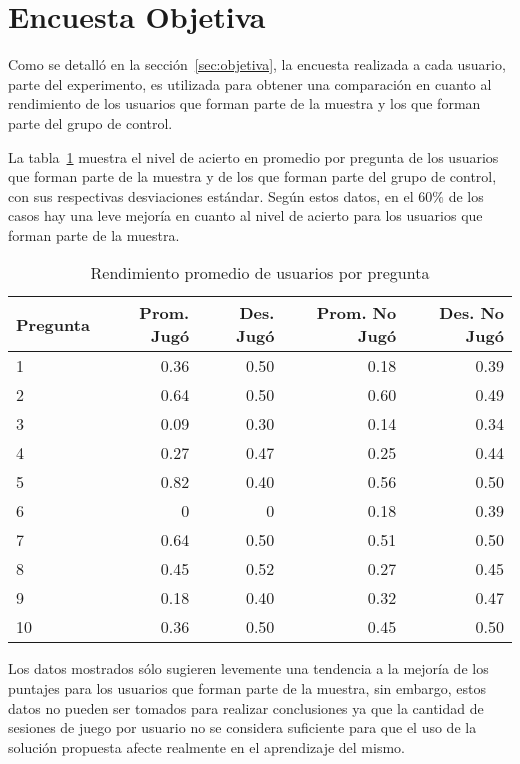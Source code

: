 \section{Encuesta Objetiva}
\label{sec:res_OBJETIVA}

Como se detalló en la sección~\ref{sec:objetiva}, la encuesta realizada a cada
usuario, parte del experimento, es utilizada para obtener una comparación en
cuanto al rendimiento de los usuarios que forman parte de la muestra y los que
forman parte del grupo de control.

La tabla~\ref{tab:objetiva_rendimiento_por_pregunta} muestra el nivel de acierto
en promedio por pregunta de los usuarios que forman parte de la muestra y de los que
forman parte del grupo de control, con sus respectivas desviaciones estándar. Según
estos datos, en el $60\%$ de los casos hay una leve mejoría en cuanto al nivel de acierto
para los usuarios que forman parte de la muestra.

\begin{table}[!hbt]
\centering
\begin{tabular}{|l|r|r|r|r|}
\hline
\rowcolor{gris} 
\textbf{Pregunta} & 
\textbf{Prom. Jugó} & 
\textbf{Des. Jugó} & 
\textbf{Prom. No Jugó} & 
\textbf{Des. No Jugó} \\
\hline
1 & 0.36 & 0.50 & 0.18 & 0.39 \\
\hline
2 & 0.64 & 0.50 & 0.60 & 0.49 \\
\hline
3 & 0.09 & 0.30 & 0.14 & 0.34 \\
\hline
4 & 0.27 & 0.47 & 0.25 & 0.44 \\
\hline
5 & 0.82 & 0.40 & 0.56 & 0.50 \\
\hline
6 & 0 & 0 & 0.18 & 0.39 \\
\hline
7 & 0.64 & 0.50 & 0.51 & 0.50 \\
\hline
8 & 0.45 & 0.52 & 0.27 & 0.45 \\
\hline
9 & 0.18 & 0.40 & 0.32 & 0.47 \\
\hline
10 & 0.36 & 0.50 & 0.45 & 0.50 \\
\hline
\end{tabular}
\caption{Rendimiento promedio de usuarios por pregunta}
\label{tab:objetiva_rendimiento_por_pregunta}
\end{table}

Los datos mostrados sólo sugieren levemente una tendencia a la mejoría de los puntajes 
para los usuarios que forman parte de la muestra, sin embargo, estos datos no pueden ser 
tomados para realizar conclusiones ya que la cantidad de sesiones de juego por usuario no 
se considera suficiente para que el uso de la solución propuesta afecte realmente en el 
aprendizaje del mismo.
